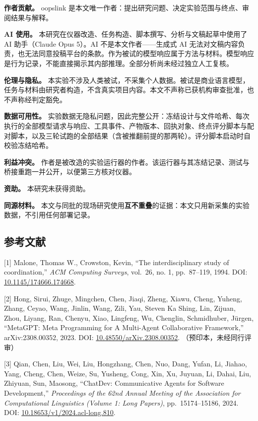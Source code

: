 \documentclass[
]{article}
\begin{document}
\textbf{作者贡献。} oopslink
是本文唯一作者：提出研究问题、决定实验范围与终点、审阅结果与解释。

\textbf{AI 使用。}
本研究在仪器改造、任务构造、脚本撰写、分析与文稿起草中使用了 AI
助手（Claude Opus 5）。AI 不是本文作者------生成式 AI
无法对文稿内容负责，也无法同意投稿平台的条款。作为被试的模型响应属于方法与材料。模型响应是行为记录，不能直接揭示其内部推理。全部分析尚未经过独立人工复核。

\textbf{伦理与隐私。}
本实验不涉及人类被试，不采集个人数据。被试是商业语言模型，任务与材料由研究者构造，不含真实项目内容。本文不声称已获机构审查批准，也不声称经判定豁免。

\textbf{数据可用性。}
实验数据无隐私问题，因此完整公开：冻结设计与文件哈希、每次执行的全部模型请求与响应、工具事件、产物版本、回执对象、终点评分脚本与配对脚本，以及三轮试跑的全部结果（含被推翻前提的那两轮）。评分脚本启动时自校验冻结哈希。

\textbf{利益冲突。}
作者是被改造的实验运行器的作者。该运行器与其冻结记录、测试与桥接重跑一并公开，以便第三方核对仪器。

\textbf{资助。} 本研究未获得资助。

\textbf{同源材料。}
本文与同批的现场研究使用\textbf{互不重叠}的证据：本文只用新采集的实验数据，不引用任何部署记录。

\subsection{参考文献}\label{ux53c2ux8003ux6587ux732e}

{[}1{]} Malone, Thomas W., Crowston, Kevin, ``The interdisciplinary
study of coordination,'' \emph{ACM Computing Surveys}, vol.~26, no. 1,
pp.~87--119, 1994. DOI:
\href{https://doi.org/10.1145/174666.174668}{10.1145/174666.174668}.

{[}2{]} Hong, Sirui, Zhuge, Mingchen, Chen, Jiaqi, Zheng, Xiawu, Cheng,
Yuheng, Zhang, Ceyao, Wang, Jinlin, Wang, Zili, Yau, Steven Ka Shing,
Lin, Zijuan, Zhou, Liyang, Ran, Chenyu, Xiao, Lingfeng, Wu, Chenglin,
Schmidhuber, Jürgen, ``MetaGPT: Meta Programming for A Multi-Agent
Collaborative Framework,'' arXiv:2308.00352, 2023. DOI:
\href{https://doi.org/10.48550/arXiv.2308.00352}{10.48550/arXiv.2308.00352}.
（预印本，未经同行评审）

{[}3{]} Qian, Chen, Liu, Wei, Liu, Hongzhang, Chen, Nuo, Dang, Yufan,
Li, Jiahao, Yang, Cheng, Chen, Weize, Su, Yusheng, Cong, Xin, Xu,
Juyuan, Li, Dahai, Liu, Zhiyuan, Sun, Maosong, ``ChatDev: Communicative
Agents for Software Development,'' \emph{Proceedings of the 62nd Annual
Meeting of the Association for Computational Linguistics (Volume 1: Long
Papers)}, pp.~15174--15186, 2024. DOI:
\href{https://doi.org/10.18653/v1/2024.acl-long.810}{10.18653/v1/2024.acl-long.810}.
\end{document}
